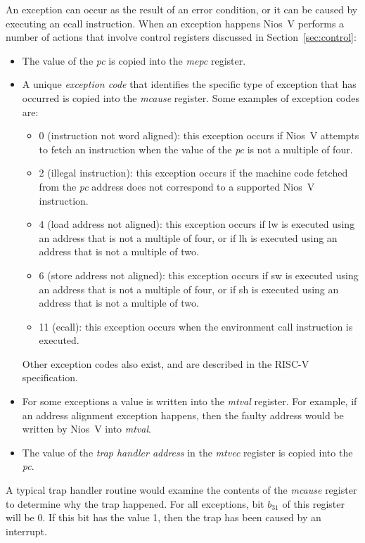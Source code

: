 \documentclass[11pt, twoside, pdftex]{article}
\begin{document}
An exception can occur as the result of an error condition, or it can be caused by
executing an {\sf ecall} instruction. When an exception happens Nios~V performs a number
of actions that involve control registers discussed in Section~\ref{sec:control}:
\vspace{-\baselineskip}
\begin{itemize}
\item The value of the {\it pc} is copied into the {\it mepc} register. 
\item A unique {\it exception code} that identifies the specific type of exception that
has occurred is copied into the {\it mcause} register. Some examples of exception codes are: 
\begin{itemize}
\item 0 (instruction not word aligned): this exception occurs if Nios~V attempts to fetch
an instruction when the value of the {\it pc} is not a multiple of four.
\item 2 (illegal instruction): this exception occurs if the machine code fetched from the
{\it pc} address does not correspond to a supported Nios~V instruction.
\item 4 (load address not aligned): this exception occurs if {\sf lw} is executed
using an address that is not a multiple of four, or if {\sf lh} is executed using
an address that is not a multiple of two.
\item 6 (store address not aligned): this exception occurs if {\sf sw} is executed
using an address that is not a multiple of four, or if {\sf sh} is executed using
an address that is not a multiple of two.
\item 11 (ecall): this exception occurs when the environment
call instruction is executed.
\end{itemize}

Other exception codes also exist, and are described in the RISC-V specification.

\item For some exceptions a value is written into the {\it mtval} register. For example,
if an address alignment exception happens, then the faulty address would be written by
Nios~V into {\it mtval}.
\item The value of the {\it trap handler address} in the {\it mtvec} register is copied 
into the {\it pc}.
\end{itemize}

A typical trap handler routine would examine the contents of the {\it mcause} register to
determine why the trap happened. For all exceptions, bit $b_{31}$ of this register will be
0. If this bit has the value 1, then the trap has been caused by an interrupt.
\end{document}
